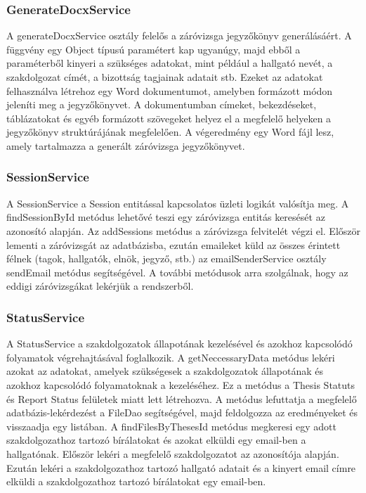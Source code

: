 \subsubsection{GenerateDocxService}

A generateDocxService osztály felelős a záróvizsga jegyzőkönyv generálásáért. A függvény egy Object típusú paramétert kap ugyanúgy, majd ebből a paraméterből kinyeri a szükséges adatokat, mint például a hallgató nevét, a szakdolgozat címét, a bizottság tagjainak adatait stb. Ezeket az adatokat felhasználva létrehoz egy Word dokumentumot, amelyben formázott módon jeleníti meg a jegyzőkönyvet. A dokumentumban címeket, bekezdéseket, táblázatokat és egyéb formázott szövegeket helyez el a megfelelő helyeken a jegyzőkönyv struktúrájának megfelelően. A végeredmény egy Word fájl lesz, amely tartalmazza a generált záróvizsga jegyzőkönyvet.

\subsubsection{SessionService}

A SessionService a Session entitással kapcsolatos üzleti logikát valósítja meg. A findSessionById metódus lehetővé teszi egy záróvizsga entitás keresését az azonosító alapján. Az addSessions metódus a záróvizsga felvitelét végzi el. Először lementi a záróvizsgát az adatbázisba, ezután emaileket küld az összes érintett félnek (tagok, hallgatók, elnök, jegyző, stb.) az emailSenderService osztály sendEmail metódus segítségével. A további metódusok arra szolgálnak, hogy az eddigi záróvizsgákat lekérjük a rendszerből.

\subsubsection{StatusService}

A StatusService a szakdolgozatok állapotának kezelésével és azokhoz kapcsolódó folyamatok végrehajtásával foglalkozik. A getNeccessaryData metódus lekéri azokat az adatokat, amelyek szükségesek a szakdolgozatok állapotának és azokhoz kapcsolódó folyamatoknak a kezeléséhez. Ez a metódus a Thesis Statuts és Report Status felületek miatt lett létrehozva. A metódus lefuttatja a megfelelő adatbázis-lekérdezést a FileDao segítségével, majd feldolgozza az eredményeket és visszaadja egy listában. A findFilesByThesesId metódus megkeresi egy adott szakdolgozathoz tartozó bírálatokat és azokat elküldi egy email-ben a hallgatónak. Először lekéri a megfelelő szakdolgozatot az azonosítója alapján. Ezután lekéri a szakdolgozathoz tartozó hallgató adatait és a kinyert email címre elküldi a szakdolgozathoz tartozó bírálatokat egy email-ben.


